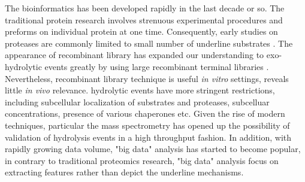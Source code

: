 The bioinformatics has been developed rapidly in the last decade or so. The traditional protein research involves strenuous experimental procedures and preforms on individual protein at one time. Consequently, early studies on proteases are commonly limited to small number of underline substrates \cite{:1992aa}. The appearance of recombinant library has expanded our understanding to exo-hydrolytic events greatly by using large recombinant terminal libraries \cite{Gupta:2010aa}. Nevertheless, recombinant library technique is useful \textit{in vitro} settings, reveals little \textit{in vivo} relevance.  hydrolytic events have more stringent restrictions, including subcellular localization of substrates and proteases, subcelluar concentrations, presence of various chaperones etc. Given the rise of modern techniques, particular the mass spectrometry has opened up the possibility of validation of  hydrolysis events in a high throughput fashion. In addition, with rapidly growing data volume, "big data"  analysis has started to become popular, in contrary to traditional proteomics research, "big data" analysis focus on extracting features rather than depict the underline mechanisms. 
